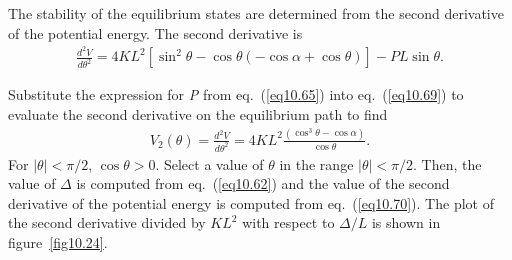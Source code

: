 \documentclass{AeroStructure-ERJohnson}
\begin{document}
{\def\thefigure{10.23}
}

The stability of the equilibrium states are determined from the second derivative of the potential energy. The second derivative is
\begin{align}\label{eq10.69}
\frac{d^{2} V}{d \theta^{2}}=4 K L^{2}[\sin ^{2} \theta-\cos \theta(-\cos \alpha+\cos \theta)]-P L \sin \theta.
\end{align}
\vspace*{5pt}
\clearpage

\noindent Substitute the expression for \textit{P} from eq.~(\ref{eq10.65}) into eq.~(\ref{eq10.69}) to evaluate the second derivative on the equilibrium path to find
\begin{align}\label{eq10.70}
V_{2}(\theta)=\frac{d^{2} V}{d \theta^{2}}=4 K L^{2} \frac{\left(\cos ^{3} \theta-\cos \alpha\right)}{\cos \theta}.
\end{align}
For $|\theta|<\pi / 2$, $\cos \theta>0$. Select a value of $\theta$ in the range $|\theta|<\pi / 2$. Then, the value of $\Delta$ is computed from eq.~(\ref{eq10.62}) and the value of the second derivative of the potential energy is computed from eq.~(\ref{eq10.70}). The plot of the second derivative divided by $K L^{2}$ with respect to $\Delta / L$ is shown in figure~\ref{fig10.24}.
\end{document}
